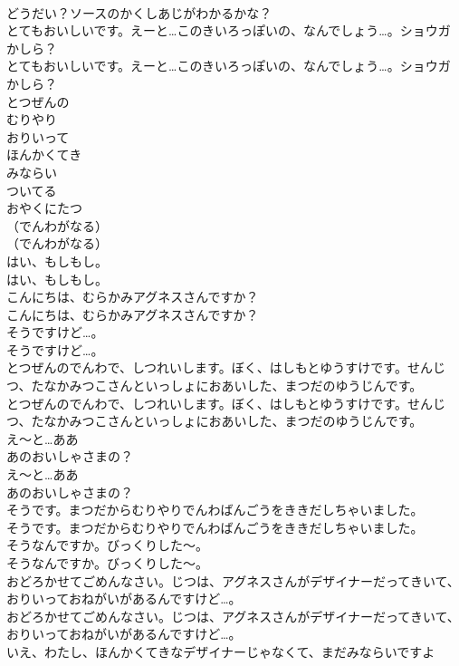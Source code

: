 \documentclass[8pt]{extreport}
\begin{document}
\begin{CJK}{UTF8}{min}
\\	どうだい？ソースのかくしあじがわかるかな？
\\	とてもおいしいです。えーと…このきいろっぽいの、なんでしょう…。ショウガかしら？
\\	とてもおいしいです。えーと…このきいろっぽいの、なんでしょう…。ショウガかしら？
\\	とつぜんの
\\	むりやり
\\	おりいって
\\	ほんかくてき
\\	みならい
\\	ついてる
\\	おやくにたつ
\\	（でんわがなる）
\\	（でんわがなる）
\\	はい、もしもし。
\\	はい、もしもし。
\\	こんにちは、むらかみアグネスさんですか？
\\	こんにちは、むらかみアグネスさんですか？
\\	そうですけど…。
\\	そうですけど…。
\\	とつぜんのでんわで、しつれいします。ぼく、はしもとゆうすけです。せんじつ、たなかみつこさんといっしょにおあいした、まつだのゆうじんです。
\\	とつぜんのでんわで、しつれいします。ぼく、はしもとゆうすけです。せんじつ、たなかみつこさんといっしょにおあいした、まつだのゆうじんです。
\\	え～と…ああ
\\	あのおいしゃさまの？
\\	え～と…ああ
\\	あのおいしゃさまの？
\\	そうです。まつだからむりやりでんわばんごうをききだしちゃいました。
\\	そうです。まつだからむりやりでんわばんごうをききだしちゃいました。
\\	そうなんですか。びっくりした～。
\\	そうなんですか。びっくりした～。
\\	おどろかせてごめんなさい。じつは、アグネスさんがデザイナーだってきいて、おりいっておねがいがあるんですけど…。
\\	おどろかせてごめんなさい。じつは、アグネスさんがデザイナーだってきいて、おりいっておねがいがあるんですけど…。
\\	いえ、わたし、ほんかくてきなデザイナーじゃなくて、まだみならいですよ

\end{CJK}
\end{document}
